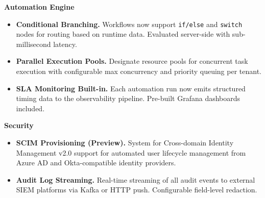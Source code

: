 \begin{featurebox}
  {\small\bfseries\color{accTeal}Automation Engine\par}
  \vspace{4pt}

  \begin{itemize}[leftmargin=*,nosep,itemsep=0pt,topsep=4pt]
    \item \textbf{Conditional Branching.} Workflows now support
      \texttt{if/else} and \texttt{switch} nodes for routing based on runtime
      data. Evaluated server-side with sub-millisecond latency.
    \item \textbf{Parallel Execution Pools.} Designate resource pools for
      concurrent task execution with configurable max concurrency and priority
      queuing per tenant.
    \item \textbf{SLA Monitoring Built-in.} Each automation run now emits
      structured timing data to the observability pipeline. Pre-built Grafana
      dashboards included.
  \end{itemize}
\end{featurebox}

\begin{featurebox}
  {\small\bfseries\color{accTeal}Security\par}
  \vspace{4pt}

  \begin{itemize}[leftmargin=*,nosep,itemsep=0pt,topsep=4pt]
    \item \textbf{SCIM Provisioning (Preview).} System for Cross-domain
      Identity Management v2.0 support for automated user lifecycle
      management from Azure AD and Okta-compatible identity providers.
    \item \textbf{Audit Log Streaming.} Real-time streaming of all audit
      events to external SIEM platforms via Kafka or HTTP push. Configurable
      field-level redaction.
  \end{itemize}
\end{featurebox}


